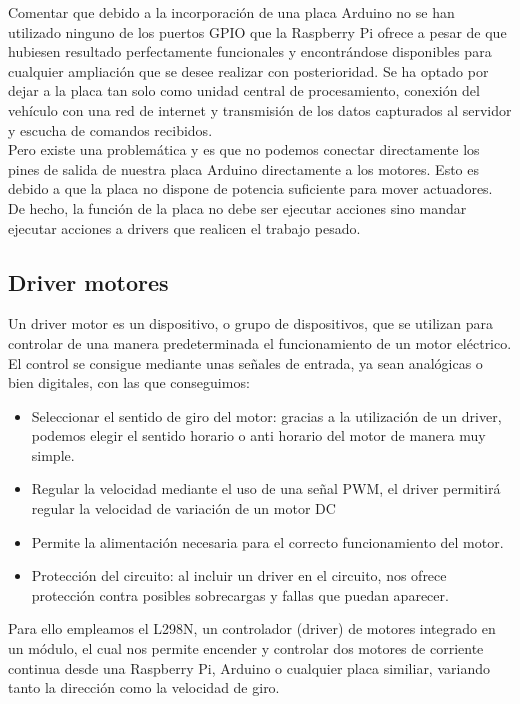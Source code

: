 Comentar que debido a la incorporación de una placa Arduino no se han utilizado ninguno de los puertos GPIO que la Raspberry Pi ofrece a pesar de que hubiesen resultado perfectamente 
funcionales y encontrándose disponibles para cualquier ampliación que se desee realizar con posterioridad. Se ha optado por dejar a la placa tan solo como unidad central de 
procesamiento, conexión del vehículo con una red de internet y transmisión de los datos capturados al servidor y escucha de comandos recibidos.\\

Pero existe una problemática y es que no podemos conectar directamente los pines de salida de nuestra placa Arduino directamente a los motores. Esto es debido a
que la placa no dispone de potencia suficiente para mover actuadores. De hecho, la función de la placa no debe ser ejecutar acciones sino mandar ejecutar acciones a drivers que
realicen el trabajo pesado.\\

\subsection{Driver motores}

Un driver motor es un dispositivo, o grupo de dispositivos, que se utilizan para controlar de una manera predeterminada el funcionamiento de un motor eléctrico. El control 
se consigue mediante unas señales de entrada, ya sean analógicas o bien digitales, con las que 
conseguimos:

\begin{itemize}
 \item Seleccionar el sentido de giro del motor: gracias a la utilización de un driver, podemos 
elegir el sentido horario o anti horario del motor de manera muy simple.
\item Regular la velocidad mediante el uso de una señal PWM, el driver permitirá regular la velocidad de variación de un motor DC
\item Permite la alimentación necesaria para el correcto funcionamiento del motor.
\item Protección del circuito: al incluir un driver en el circuito, nos ofrece protección contra 
posibles sobrecargas y fallas que puedan aparecer.
\end{itemize}

Para ello empleamos el L298N, un controlador (driver) de motores integrado en un módulo, el cual nos permite encender y controlar dos motores de corriente continua desde una Raspberry Pi, Arduino o
cualquier placa similiar, variando tanto la dirección como la velocidad de giro.\\

